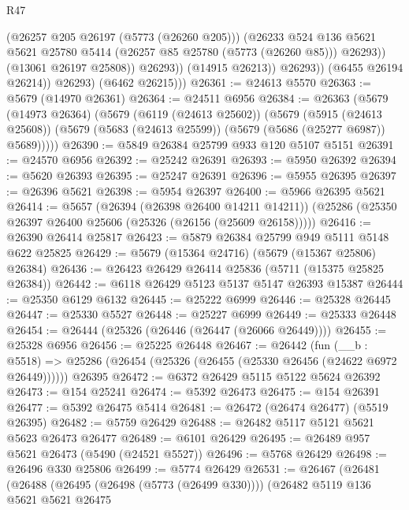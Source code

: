 \begin{lexlean}{R47}
\begin{coremodule}
                          (@26257 @205 @26197 (@5773 (@26260 @205)))
                          (@26233
                            @524
                            @136
                            @5621
                            @5621
                            @25780
                            @5414
                            (@26257 @85 @25780 (@5773 (@26260 @85)))
                            @26293))
                        (@13061 @26197 @25808))
                      @26293))
                  (@14915 @26213))
                @26293))
            (@6455 @26194 @26214))
          @26293)
        (@6462 @26215)))
@26361 := @24613 @5570
@26363 := @5679 (@14970 @26361)
@26364 := @24511 @6956
@26384 := @26363
    (@5679
      (@14973 @26364)
      (@5679
        (@6119 (@24613 @25602))
        (@5679
          (@5915 (@24613 @25608))
          (@5679 (@5683 (@24613 @25599)) (@5679 (@5686 (@25277 @6987)) @5689)))))
@26390 := @5849 @26384 @25799 @933 @120 @5107 @5151
@26391 := @24570 @6956
@26392 := @25242 @26391
@26393 := @5950 @26392
@26394 := @5620 @26393
@26395 := @25247 @26391
@26396 := @5955 @26395
@26397 := @26396 @5621
@26398 := @5954 @26397
@26400 := @5966 @26395 @5621
@26414 := @5657
    (@26394 (@26398 @26400 @14211 @14211))
    (@25286 (@25350 @26397 @26400 @25606 (@25326 (@26156 (@25609 @26158)))))
@26416 := @26390 @26414 @25817
@26423 := @5879 @26384 @25799 @949 @5111 @5148 @622 @25825
@26429 := @5679 (@15364 @24716) (@5679 (@15367 @25806) @26384)
@26436 := @26423 @26429 @26414 @25836 (@5711 (@15375 @25825 @26384))
@26442 := @6118 @26429 @5123 @5137 @5147 @26393 @15387
@26444 := @25350 @6129 @6132
@26445 := @25222 @6999
@26446 := @25328 @26445
@26447 := @25330 @5527
@26448 := @25227 @6999
@26449 := @25333 @26448
@26454 := @26444 (@25326 (@26446 (@26447 (@26066 @26449))))
@26455 := @25328 @6956
@26456 := @25225 @26448
@26467 := @26442
    (fun (__b : @5518) => @25286 (@26454 (@25326 (@26455 (@25330 @26456 (@24622 @6972 @26449))))))
    @26395
@26472 := @6372 @26429 @5115 @5122 @5624 @26392
@26473 := @154 @25241
@26474 := @5392 @26473
@26475 := @154 @26391
@26477 := @5392 @26475 @5414
@26481 := @26472 (@26474 @26477) (@5519 @26395)
@26482 := @5759 @26429
@26488 := @26482 @5117 @5121 @5621 @5623 @26473 @26477
@26489 := @6101 @26429
@26495 := @26489 @957 @5621 @26473 (@5490 (@24521 @5527))
@26496 := @5768 @26429
@26498 := @26496 @330 @25806
@26499 := @5774 @26429
@26531 := @26467
    (@26481
      (@26488
        (@26495 (@26498 (@5773 (@26499 @330))))
        (@26482
          @5119
          @136
          @5621
          @5621
          @26475

\end{coremodule}
\end{lexlean}
